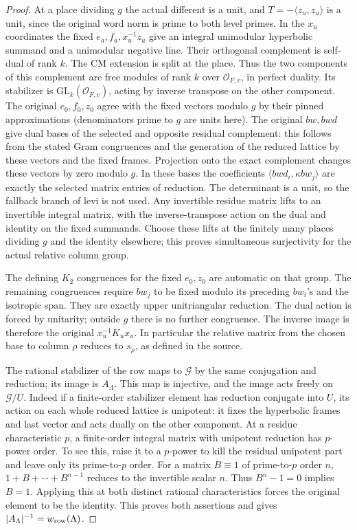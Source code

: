 \begin{proof}
At a place dividing \(g\) the actual different is a unit,
and \(T=-\langle z_u,z_u\rangle\) is a unit, since the original
word norm is prime to both level primes. In the \(x_u\)
coordinates the fixed \(e_a,f_a,x_u^{-1}z_u\) give an integral
unimodular hyperbolic summand and a unimodular negative line.
Their orthogonal complement is self-dual of rank \(k\).
The CM extension is split at the place. Thus the two components
of this complement are free modules of rank \(k\) over
\(\mathcal O_{F,v}\), in perfect duality. Its stabilizer is
\(\mathrm{GL}_k(\mathcal O_{F,v})\), acting by inverse transpose
on the other component. The original \(e_0,f_0,z_0\) agree
with the fixed vectors modulo \(g\) by their pinned
approximations (denominators prime to \(g\) are units here).
The original \(bw,bwd\) give dual bases of the selected
and opposite residual complement: this follows from the
stated Gram congruences and the generation of the reduced
lattice by these vectors and the fixed frames. Projection
onto the exact complement changes these vectors by zero
modulo \(g\). In these bases the coefficients
\(\langle bwd_i,\kappa bw_j\rangle\) are exactly the selected
matrix entries of reduction. The determinant is a unit, so
the fallback branch of \(\mathrm{levi}\) is not used. Any
invertible residue matrix lifts to an invertible integral
matrix, with the inverse-transpose action on the dual and
identity on the fixed summands. Choose these lifts at the
finitely many places dividing \(g\) and the identity elsewhere;
this proves simultaneous surjectivity for the actual relative
column group.

The defining \(K_2\) congruences for the fixed \(e_0,z_0\) are
automatic on that group. The remaining congruences require
\(bw_j\) to be fixed modulo its preceding \(bw_i\)'s and the
isotropic span. They are exactly upper unitriangular reduction.
The dual action is forced by unitarity; outside \(g\) there
is no further congruence. The inverse image is therefore
the original \(x_u^{-1}K_ux_u\). In particular the relative
matrix from the chosen base to column \(\rho\) reduces
to \(s_\rho\), as defined in the source.

The rational stabilizer of the row maps to \(\mathcal G\) by
the same conjugation and reduction; its image is \(A_\Lambda\).
This map is injective, and the image acts freely on
\(\mathcal G/U\). Indeed if a finite-order stabilizer element
has reduction conjugate into \(U\), its action on each
whole reduced lattice is unipotent: it fixes the hyperbolic
frames and last vector and acts dually on the other component.
At a residue characteristic \(p\), a finite-order integral
matrix with unipotent reduction has \(p\)-power order. To see
this, raise it to a \(p\)-power to kill the residual unipotent
part and leave only its prime-to-\(p\) order. For a matrix
\(B\equiv1\) of prime-to-\(p\) order \(n\),
\(1+B+\cdots+B^{n-1}\) reduces to the invertible scalar \(n\).
Thus \(B^n-1=0\) implies \(B=1\). Applying this at both
distinct rational characteristics forces the original element
to be the identity. This proves both assertions and gives
\(|A_\Lambda|^{-1}=w_{\rm row}(\Lambda)\).


\end{proof}
